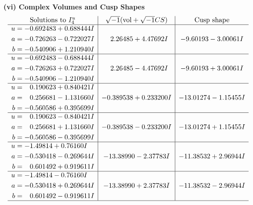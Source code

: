 \documentclass[1p]{elsarticle_modified}
\theoremstyle{definition}
\newcommand{\I}{\sqrt{-1}}
\begin{document}
\newpage\flushleft \textbf{(vi) Complex Volumes and Cusp Shapes}
$$\begin{array}{c|c|c}  
\text{Solutions to }I^u_{4}& \I (\text{vol} + \sqrt{-1}CS) & \text{Cusp shape}\\
 \hline 
\begin{aligned}
u &= -0.692483 + 0.688444 I \\
a &= -0.726263 - 0.722027 I \\
b &= -0.540906 + 1.210940 I\end{aligned}
 & \phantom{-}2.26485 + 4.47692 I & -9.60193 - 3.00061 I \\ \hline\begin{aligned}
u &= -0.692483 - 0.688444 I \\
a &= -0.726263 + 0.722027 I \\
b &= -0.540906 - 1.210940 I\end{aligned}
 & \phantom{-}2.26485 - 4.47692 I & -9.60193 + 3.00061 I \\ \hline\begin{aligned}
u &= \phantom{-}0.190623 + 0.840421 I \\
a &= \phantom{-}0.256681 - 1.131660 I \\
b &= -0.560586 + 0.395699 I\end{aligned}
 & -0.389538 + 0.233200 I & -13.01274 - 1.15455 I \\ \hline\begin{aligned}
u &= \phantom{-}0.190623 - 0.840421 I \\
a &= \phantom{-}0.256681 + 1.131660 I \\
b &= -0.560586 - 0.395699 I\end{aligned}
 & -0.389538 - 0.233200 I & -13.01274 + 1.15455 I \\ \hline\begin{aligned}
u &= -1.49814 + 0.76160 I \\
a &= -0.530418 - 0.269644 I \\
b &= \phantom{-}0.601492 + 0.919611 I\end{aligned}
 & -13.38990 - 2.37783 I & -11.38532 + 2.96944 I \\ \hline\begin{aligned}
u &= -1.49814 - 0.76160 I \\
a &= -0.530418 + 0.269644 I \\
b &= \phantom{-}0.601492 - 0.919611 I\end{aligned}
 & -13.38990 + 2.37783 I & -11.38532 - 2.96944 I\\
 \hline 
 \end{array}$$\newpage\newpage\renewcommand{\arraystretch}{1}
\end{document}
